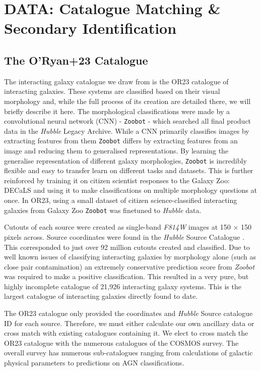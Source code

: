 \section{DATA: Catalogue Matching \& Secondary Identification} \label{data}
\subsection{The O'Ryan+23 Catalogue}
\noindent The interacting galaxy catalogue we draw from is the OR23 catalogue of interacting galaxies. These systems are classified based on their visual morphology and, while the full process of its creation are detailed there, we will briefly describe it here. The morphological classifications were made by a convolutional neural network (CNN) - \texttt{Zoobot} - which searched all final product data in the \textit{Hubble} Legacy Archive. While a CNN primarily classifies images by extracting features from them \texttt{Zoobot} differs by extracting features from an image and reducing them to generalised representations. By learning the generalise representation of different galaxy morphologies, \texttt{Zoobot} is incredibly flexible and easy to transfer learn on different tasks and datasets. This is further reinforced by training it on citizen scientist responses to the Galaxy Zoo: DECaLS \citep{2022MNRAS.509.3966W} and using it to make classifications on multiple morphology questions at once. In OR23, using a small dataset of citizen science-classified interacting galaxies from Galaxy Zoo \citep{2008MNRAS.389.1179L} \texttt{Zoobot} was finetuned to \textit{Hubble} data.

Cutouts of each source were created as single-band \textit{F814W} images at 150 $\times$ 150 pixels across. Source coordinates were found in the \textit{Hubble} Source Catalogue \citep{2016AJ....151..134W}. This corresponded to just over 92 million cutouts created and classified. Due to well known issues of classifying interacting galaxies by morphology alone (such as close pair contamination) an extremely conservative prediction score from \textit{Zoobot} was required to make a positive classification. This resulted in a very pure, but highly incomplete catalogue of 21,926 interacting galaxy systems. This is the largest catalogue of interacting galaxies directly found to date.

The OR23 catalogue only provided the coordinates and \textit{Hubble} Source catalogue ID for each source. Therefore, we must either calculate our own ancillary data or cross match with existing catalogues containing it. We elect to cross match the OR23 catalogue with the numerous catalogues of the COSMOS survey. The overall survey has numerous sub-catalogues ranging from calculations of galactic physical parameters to predictions on AGN classifications. 

